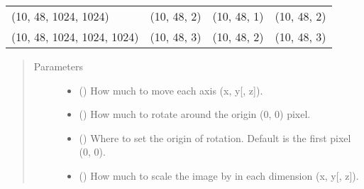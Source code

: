 \documentclass[letterpaper,10pt,english]{sphinxmanual}
\begin{document}
\begin{fulllineitems}
\begin{fulllineitems}
\begin{savenotes}\sphinxattablestart
\centering
\begin{tabulary}{\linewidth}[t]{|T|T|T|T|}
\hline
{}\relax &\relax &\relax &\relax \\
\hline
(10, 48, 1024, 1024)
&
(10, 48, 2)
&
(10, 48, 1)
&
(10, 48, 2)
\\
\hline
(10, 48, 1024, 1024, 1024)
&
(10, 48, 3)
&
(10, 48, 2)
&
(10, 48, 3)
\\
\hline
\end{tabulary}
\par
\sphinxattableend\end{savenotes}
\begin{quote}\begin{description}
\item[{Parameters}] \leavevmode\begin{itemize}
\item {} 
 () \textendash{} How much to move each axis (x, y{[}, z{]}).

\item {} 
 () \textendash{} How much to rotate around the origin (0, 0) pixel.

\item {} 
 () \textendash{} Where to set the origin of rotation. Default is the first
pixel (0, 0).

\item {} 
 () \textendash{} How much to scale the image by in each dimension (x, y{[},
z{]}).

\end{itemize}

\end{description}\end{quote}

\end{fulllineitems}



\end{fulllineitems}
\end{document}
